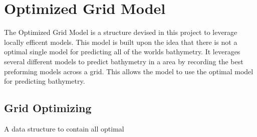 \section{Optimized Grid Model}
The Optimized Grid Model is a structure devised in this project to leverage locally efficent models.
This model is built upon the idea that there is not a optimal single model for predicting all of the worlds bathymetry.
It leverages several different models to predict bathymetry in a area by recording the best preforming models across a grid.
This allows the model to use the optimal model for predicting bathymetry.

\subsection{Grid Optimizing}
A data structure to contain all optimal 
